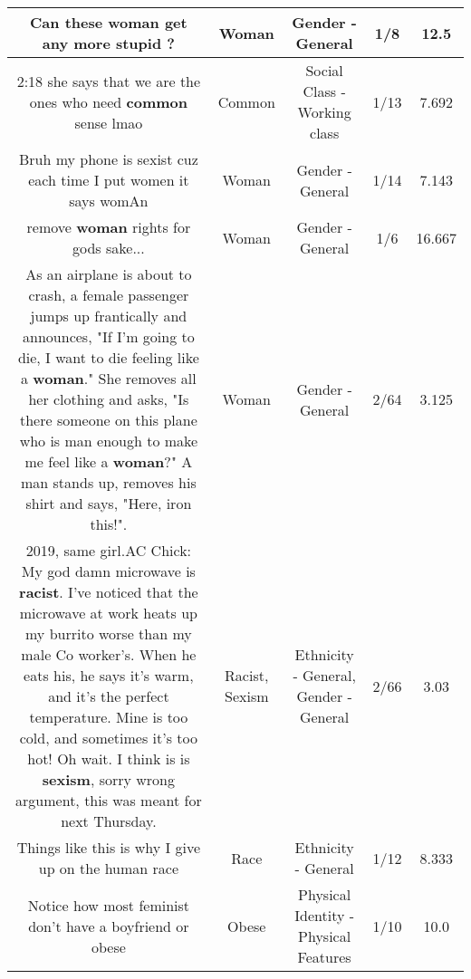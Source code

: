 \documentclass[11pt]{article}
\newlength\mylength
\begin{document}
\begin{center}
\begin{longtable}{|C{.65\mylength}|C{.30\mylength}|C{.12\mylength}|C{.12\mylength}|C{.12\mylength}|}
  \small Can these \textbf{woman} get any more stupid ?\normalsize   & Woman & Gender - General & 1/8 & 12.5 \\  \hline
  \small 2:18 she says that we are the ones who need \textbf{common} sense lmao\normalsize   & Common & Social Class - Working class & 1/13 & 7.692 \\  \hline
  \small Bruh my phone is sexist cuz each time I put women it says womAn\normalsize   & Woman & Gender - General & 1/14 & 7.143 \\  \hline
  \small remove \textbf{woman} rights for gods sake...\normalsize   & Woman & Gender - General & 1/6 & 16.667 \\  \hline
  \small As an airplane is about to crash, a female passenger jumps up frantically and announces, "If I'm going to die, I want to die feeling like a \textbf{woman}." She removes all her clothing and asks, "Is there someone on this plane who is man enough to make me feel like a \textbf{woman}?" A man stands up, removes his shirt and says, "Here, iron this!".\normalsize   & Woman & Gender - General & 2/64 & 3.125 \\  \hline
  \small 2019, same girl.AC Chick: My god damn microwave is \textbf{racist}. I've noticed that the microwave at work heats up my burrito worse than my male Co worker's. When he eats his, he says it's warm, and it's the perfect temperature. Mine is too cold, and sometimes it's too hot! Oh wait. I think is is \textbf{sexism}, sorry wrong argument, this was meant for next Thursday.\normalsize   & Racist, Sexism & Ethnicity - General, Gender - General & 2/66 & 3.03 \\  \hline
  \small Things like this is why I give up on the human race\normalsize   & Race & Ethnicity - General & 1/12 & 8.333 \\  \hline
  \small Notice how most feminist don't have a boyfriend or obese\normalsize   & Obese & Physical Identity - Physical Features & 1/10 & 10.0 \\  \hline

\end{longtable}
\end{center}
\end{document}
